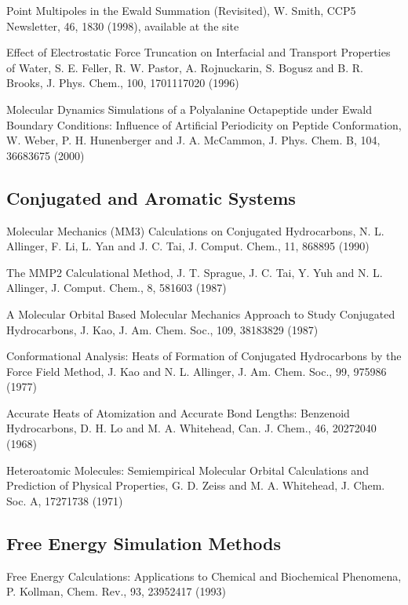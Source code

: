 \documentclass[letterpaper,11pt,english]{sphinxmanual}
\begin{document}
Point Multipoles in the Ewald Summation (Revisited), W. Smith, CCP5 Newsletter, 46, 18\sphinxhyphen{}30 (1998), available at the site 

Effect of Electrostatic Force Truncation on Interfacial and Transport Properties of Water, S. E. Feller, R. W. Pastor, A. Rojnuckarin, S. Bogusz and B. R. Brooks, J. Phys. Chem., 100, 17011\sphinxhyphen{}17020 (1996)

Molecular Dynamics Simulations of a Polyalanine Octapeptide under Ewald Boundary Conditions: Influence of Artificial Periodicity on Peptide Conformation, W. Weber, P. H. Hunenberger and J. A. McCammon, J. Phys. Chem. B, 104, 3668\sphinxhyphen{}3675 (2000)


\subsection{Conjugated and Aromatic Systems}
\label{\detokenize{text/references:conjugated-and-aromatic-systems}}
Molecular Mechanics (MM3) Calculations on Conjugated Hydrocarbons, N. L. Allinger, F. Li, L. Yan and J. C. Tai, J. Comput. Chem., 11, 868\sphinxhyphen{}895 (1990)

The MMP2 Calculational Method, J. T. Sprague, J. C. Tai, Y. Yuh and N. L. Allinger, J. Comput. Chem., 8, 581\sphinxhyphen{}603 (1987)

A Molecular Orbital Based Molecular Mechanics Approach to Study Conjugated Hydrocarbons, J. Kao, J. Am. Chem. Soc., 109, 3818\sphinxhyphen{}3829 (1987)

Conformational Analysis: Heats of Formation of Conjugated Hydrocarbons by the Force Field Method, J. Kao and N. L. Allinger, J. Am. Chem. Soc., 99, 975\sphinxhyphen{}986 (1977)

Accurate Heats of Atomization and Accurate Bond Lengths: Benzenoid Hydrocarbons, D. H. Lo and M. A. Whitehead, Can. J. Chem., 46, 2027\sphinxhyphen{}2040 (1968)

Hetero\sphinxhyphen{}atomic Molecules: Semi\sphinxhyphen{}empirical Molecular Orbital Calculations and Prediction of Physical Properties, G. D. Zeiss and M. A. Whitehead, J. Chem. Soc. A, 1727\sphinxhyphen{}1738 (1971)


\subsection{Free Energy Simulation Methods}
\label{\detokenize{text/references:free-energy-simulation-methods}}
Free Energy Calculations: Applications to Chemical and Biochemical Phenomena, P. Kollman, Chem. Rev., 93, 2395\sphinxhyphen{}2417 (1993)
\end{document}
